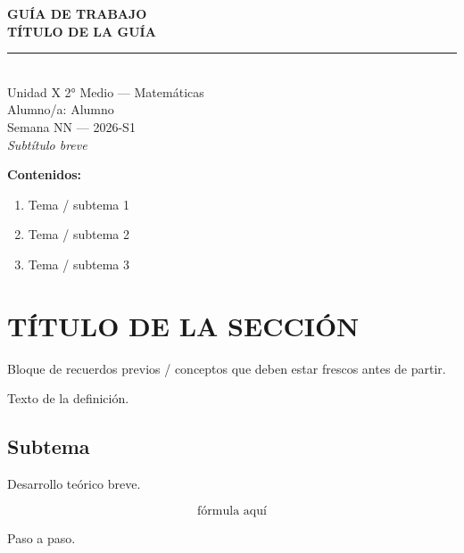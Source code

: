 \documentclass[11pt,a4paper]{article}
\newcommand{\guiaTitulo}{TÍTULO DE LA GUÍA}
\newcommand{\guiaSubtitulo}{Subtítulo breve}
\newcommand{\guiaUnidad}{Unidad X}
\newcommand{\guiaCurso}{2° Medio --- Matemáticas}
\newcommand{\guiaAlumno}{Alumno}
\newcommand{\guiaSemana}{Semana NN}
\newcommand{\guiaSemestre}{2026-S1}
\begin{document}
\thispagestyle{empty}
\vspace*{3cm}
\begin{center}
  {\Huge\bfseries\color{azulprincipal} GUÍA DE TRABAJO}\\[8pt]
  {\LARGE\bfseries\color{azuloscuro} \guiaTitulo}\\[15pt]
  {\color{azulprincipal}\rule{8cm}{2pt}}\\[15pt]
  {\Large \guiaUnidad{} \textbar{} \guiaCurso}\\[8pt]
  {\large Alumno/a: \guiaAlumno}\\[4pt]
  {\large \guiaSemana{} --- \guiaSemestre}\\[25pt]
  {\itshape\color{gray}
  \guiaSubtitulo}
\end{center}

\vspace{2cm}
\noindent\textbf{Contenidos:}
\begin{enumerate}[leftmargin=2cm]
  \item Tema / subtema 1
  \item Tema / subtema 2
  \item Tema / subtema 3
\end{enumerate}
\newpage

\section{TÍTULO DE LA SECCIÓN}

\begin{tcolorbox}[recuerda]
Bloque de recuerdos previos / conceptos que deben estar frescos antes de partir.
\end{tcolorbox}

\begin{tcolorbox}[definicion, title=Definición clave]
Texto de la definición.
\end{tcolorbox}

\subsection{Subtema}

Desarrollo teórico breve.

\begin{tcolorbox}[formula]
\[
  \text{fórmula aquí}
\]
\end{tcolorbox}

\begin{tcolorbox}[ejemplo, title=Ejemplo resuelto]
Paso a paso.
\end{tcolorbox}
\end{document}
